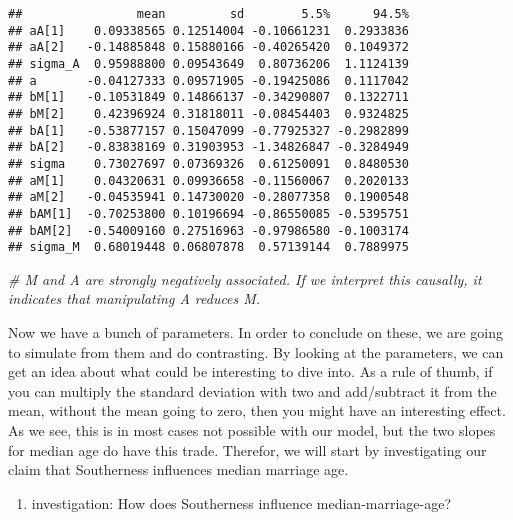 \documentclass[
]{article}
\newenvironment{Shaded}{\begin{snugshade}}{\end{snugshade}}
\newcommand{\AttributeTok}[1]{\textcolor[rgb]{0.77,0.63,0.00}{#1}}
\newcommand{\CommentTok}[1]{\textcolor[rgb]{0.56,0.35,0.01}{\textit{#1}}}
\newcommand{\ConstantTok}[1]{\textcolor[rgb]{0.00,0.00,0.00}{#1}}
\newcommand{\DecValTok}[1]{\textcolor[rgb]{0.00,0.00,0.81}{#1}}
\newcommand{\FunctionTok}[1]{\textcolor[rgb]{0.00,0.00,0.00}{#1}}
\newcommand{\NormalTok}[1]{#1}
\newcommand{\OtherTok}[1]{\textcolor[rgb]{0.56,0.35,0.01}{#1}}
\newcommand{\SpecialCharTok}[1]{\textcolor[rgb]{0.00,0.00,0.00}{#1}}
\providecommand{\tightlist}{%
  \setlength{\itemsep}{0pt}\setlength{\parskip}{0pt}}
\begin{document}
\begin{verbatim}
##                mean         sd        5.5%      94.5%
## aA[1]    0.09338565 0.12514004 -0.10661231  0.2933836
## aA[2]   -0.14885848 0.15880166 -0.40265420  0.1049372
## sigma_A  0.95988800 0.09543649  0.80736206  1.1124139
## a       -0.04127333 0.09571905 -0.19425086  0.1117042
## bM[1]   -0.10531849 0.14866137 -0.34290807  0.1322711
## bM[2]    0.42396924 0.31818011 -0.08454403  0.9324825
## bA[1]   -0.53877157 0.15047099 -0.77925327 -0.2982899
## bA[2]   -0.83838169 0.31903953 -1.34826847 -0.3284949
## sigma    0.73027697 0.07369326  0.61250091  0.8480530
## aM[1]    0.04320631 0.09936658 -0.11560067  0.2020133
## aM[2]   -0.04535941 0.14730020 -0.28077358  0.1900548
## bAM[1]  -0.70253800 0.10196694 -0.86550085 -0.5395751
## bAM[2]  -0.54009160 0.27516963 -0.97986580 -0.1003174
## sigma_M  0.68019448 0.06807878  0.57139144  0.7889975
\end{verbatim}

\begin{Shaded}
\begin{Highlighting}[]
\CommentTok{\# M and A are strongly negatively associated. If we interpret this causally, it indicates that manipulating A reduces M.}
\end{Highlighting}
\end{Shaded}

Now we have a bunch of parameters. In order to conclude on these, we are
going to simulate from them and do contrasting. By looking at the
parameters, we can get an idea about what could be interesting to dive
into. As a rule of thumb, if you can multiply the standard deviation
with two and add/subtract it from the mean, without the mean going to
zero, then you might have an interesting effect. As we see, this is in
most cases not possible with our model, but the two slopes for median
age do have this trade. Therefor, we will start by investigating our
claim that Southerness influences median marriage age.

\begin{enumerate}
\def\labelenumi{\arabic{enumi}.}
\tightlist
\item
  investigation: How does Southerness influence median-marriage-age?
\end{enumerate}

\begin{Shaded}
\end{Shaded}
\end{document}
